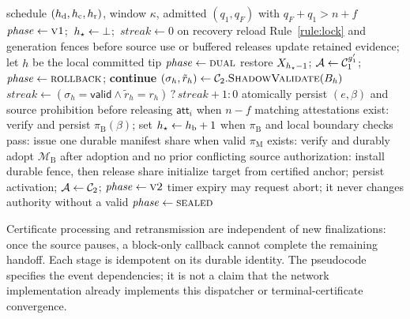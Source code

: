 \begin{algorithm}[t]
\caption{Design-level \sage{} controller at a correct validator $i$}
\label{alg:sage}
\small
\begin{algorithmic}[1]
\Require schedule $(h_{\mathrm d},h_{\mathrm c},h_{\mathrm r})$, window $\kappa$, admitted $(q_1,q_F)$ with $q_F+q_1>n+f$
\State $\mathit{phase}\gets\textsc{v1}$;\ $h_{\star}\gets\bot$;\ $\mathit{streak}\gets0$
  \State on recovery reload Rule~\ref{rule:lock} and generation fences before source use or buffered releases
  \State update retained evidence; let $h$ be the local committed tip
   $\mathit{phase}\gets\textsc{dual}$ \EndIf
    \State restore $X_{h_{\star}-1}$; $\mathcal{A}\gets\mathcal{C}_1^{g_1'}$; $\mathit{phase}\gets\textsc{rollback}$; \textbf{continue}
  \EndIf
    \State $(\sigma_h,\tilde r_h)\gets\mathcal{C}_2.\textsc{ShadowValidate}(B_h)$
    \State $\mathit{streak}\gets(\sigma_h=\mathsf{valid}\wedge\tilde r_h=r_h)\,?\,\mathit{streak}+1:0$
      \State atomically persist $(e,\beta)$ and source prohibition before releasing $\mathsf{att}_i$
    \EndIf
  \EndIf
    \State when $n-f$ matching attestations exist: verify and persist $\pi_{\mathrm B}(\beta)$; set $h_{\star}\gets h_{\mathrm b}+1$
    \State when $\pi_{\mathrm B}$ and local boundary checks pass: issue one durable manifest share
    \State when valid $\pi_{\mathrm M}$ exists: verify and durably adopt $\mathcal M_{\mathrm B}$
    \State after adoption and no prior conflicting source authorization: install durable fence, then release share
      \State initialize target from certified anchor; persist activation; $\mathcal{A}\gets\mathcal{C}_2$; $\mathit{phase}\gets\textsc{v2}$
    \EndIf
  \EndIf
  \State timer expiry may request abort; it never changes authority without a valid \AbortCert
   $\mathit{phase}\gets\textsc{sealed}$ \EndIf
\EndFor
\end{algorithmic}
\end{algorithm}

Certificate processing and retransmission are independent of new finalizations: once the source
pauses, a block-only callback cannot complete the remaining handoff. Each stage is idempotent on its
durable identity. The pseudocode specifies the event dependencies; it is not a claim that the
network implementation already implements this dispatcher or terminal-certificate convergence.

